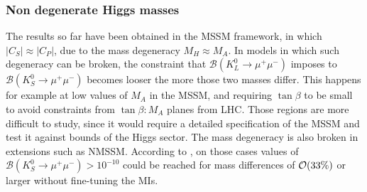 \subsubsection{Non degenerate Higgs masses}
The results so far have been obtained in the MSSM framework, in which $|C_S| \approx |C_P|$, due to the mass degeneracy $M_H\approx M_A$. In models in which such degeneracy can be broken, the constraint that $\mathcal{B}(K_L^0\rightarrow\mu^+\mu^-)$
imposes to $\mathcal{B}(K_S^0\rightarrow\mu^+\mu^-)$ becomes looser the more those two masses differ. This happens for example at low values of $M_A$ in the MSSM, and requiring $\tan\beta$ to be small to avoid constraints from $\tan\beta : M_A$ planes from LHC. Those regions are more difficult to study, since it would require a detailed specification of the MSSM and test it against bounds of the Higgs sector. The mass degeneracy is also broken in extensions such as NMSSM. According to , on those cases values of $\mathcal{B}(K_S^0\rightarrow\mu^+\mu^-) > 10^{-10}$ could be reached for mass differences of ${\cal O}(33\%)$ or larger without fine-tuning the MIs.

